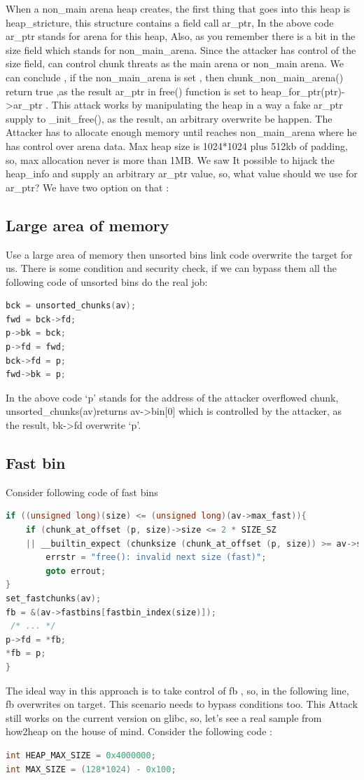 \documentclass{masterthesis}
\newcommand*\libc{glibc}
\newcommand*\fb{fast bins}
\newcommand*\ub{unsorted bins}
\begin{document}
When a non\_main arena heap creates, the first thing that goes into this heap is heap\_stricture, this structure contains a field call ar\_ptr, In the above code ar\_ptr stands for arena for this heap, Also, as you remember there is a bit in the size field which stands for non\_main\_arena. Since the attacker has control of the size field, can control chunk threats as the main arena or non\_main arena. We can conclude , if the non\_main\_arena is set , then chunk\_non\_main\_arena() return true ,as the result ar\_ptr in free() function is set to heap\_for\_ptr(ptr)->ar\_ptr .
This attack works by manipulating the heap in a way a fake ar\_ptr supply to \_init\_free(), as the result, an arbitrary overwrite be happen. The Attacker has to allocate enough memory until reaches non\_main\_arena where he has control over arena data. Max heap size is 1024*1024 plus 512kb of padding, so, max allocation never is more than 1MB.
We saw It possible to hijack the heap\_info and supply an arbitrary ar\_ptr value, so, what value should we use for ar\_ptr? We have two option on that :

\subsection{Large area of memory}
Use a large area of memory then \ub{} link code overwrite the target for us. There is some condition and security check, if we can bypass them all the following code of \ub{} do the real job:
\begin{lstlisting}[language=c,frame=tlrb]
bck = unsorted_chunks(av);
fwd = bck->fd;
p->bk = bck;
p->fd = fwd;
bck->fd = p;
fwd->bk = p;
 \end{lstlisting}
In the above code ‘p’ stands for the address of the attacker overflowed chunk, unsorted\_chunks(av)returns av->bin[0] which is controlled by the attacker, as the result, bk->fd overwrite ‘p’.

\subsection{Fast bin}
Consider following code of \fb{}
\begin{lstlisting}[language=c,frame=tlrb]
if ((unsigned long)(size) <= (unsigned long)(av->max_fast)){
	if (chunk_at_offset (p, size)->size <= 2 * SIZE_SZ
	|| __builtin_expect (chunksize (chunk_at_offset (p, size)) >= av->system_mem, 0)){
		errstr = "free(): invalid next size (fast)";
		goto errout;
}
set_fastchunks(av);
fb = &(av->fastbins[fastbin_index(size)]);
 /* ... */ 
p->fd = *fb;
*fb = p;
}

 \end{lstlisting}
The ideal way in this approach is to take control of fb , so, in the following line, fb overwrites on target. This scenario needs to bypass conditions too. This Attack still works on the current version on \libc{}, so, let's see a real sample from how2heap on the house of mind. Consider the following code : 
\begin{lstlisting}[language=c,frame=tlrb]
int HEAP_MAX_SIZE = 0x4000000;
int MAX_SIZE = (128*1024) - 0x100;
\end{lstlisting}
\end{document}
